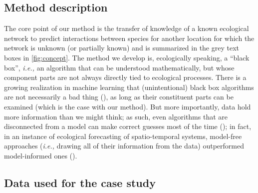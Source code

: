 \begin{refsection}
\section{Method description}\label{method-description}

The core point of our method is the transfer of knowledge of a known
ecological network to predict interactions between species for another
location for which the network is unknown (or partially known) and is
summarized in the grey text boxes in \autoref{fig:concept}. The method we develop
is, ecologically speaking, a ``black box'', \emph{i.e.,} an algorithm
that can be understood mathematically, but whose component parts are not
always directly tied to ecological processes. There is a growing
realization in machine learning that (unintentional) black box
algorithms are not necessarily a bad thing (\cite{Holm2019Defense}), as
long as their constituent parts can be examined (which is the case with
our method). But more importantly, data hold more information than we
might think; as such, even algorithms that are disconnected from a model
can make correct guesses most of the time (\cite{Halevy2009Unreasonable}); in
fact, in an instance of ecological forecasting of spatio-temporal
systems, model-free approaches (\emph{i.e.,} drawing all of their
information from the data) outperformed model-informed ones
(\cite{Perretti2013Modelfree}).

\subsection{Data used for the case
study}\label{data-used-for-the-case-study}


\end{refsection}
